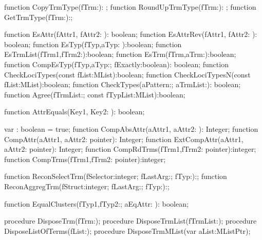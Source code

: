 function CopyTrmType(fTrm:): ;
function RoundUpTrmType(fTrm:): ;
function GetTrmType(fTrm:):;

function EsAttr(fAttr1, fAttr2: ): boolean;
function EsAttrRev(fAttr1, fAttr2: ): boolean;
function EsTyp(fTyp,aTyp: ):boolean;
function EsTrmList(fTrm1,fTrm2:):boolean;
function EsTrm(fTrm,aTrm:):boolean;
function CompEsTyp(fTyp,aTyp:; fExactly:boolean): boolean;
function CheckLociTypes(const fList:MList):boolean;
function CheckLociTypesN(const fList:MList):boolean;
function CheckTypes(aPattern:; aTrmList:): boolean;
function Agree(fTrmList:; const fTypList:MList):boolean;

function AttrEquals(Key1, Key2: ): boolean;

var : boolean = true;
function CompAbsAttr(aAttr1, aAttr2: ): Integer;
function CompAttr(aAttr1, aAttr2: pointer): Integer;
function ExtCompAttr(aAttr1, aAttr2: pointer): Integer;
function CompRdTrms(fTrm1,fTrm2: pointer):integer;
function CompTrms(fTrm1,fTrm2: pointer):integer;

function ReconSelectTrm(fSelector:integer; fLastArg:; fTyp:):;
function ReconAggregTrm(fStruct:integer; fLastArg:; fTyp:):;

function EqualClusters(fTyp1,fTyp2:; aEqAttr: ): boolean;

procedure DisposeTrm(fTrm:);
procedure DisposeTrmList(fTrmList:);
procedure DisposeListOfTerms(fList:);
procedure DisposeTrmMList(var aList:MListPtr);


